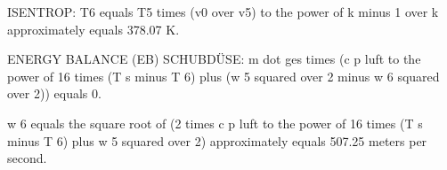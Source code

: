 ISENTROP: T6 equals T5 times (v0 over v5) to the power of k minus 1 over k approximately equals 378.07 K.

ENERGY BALANCE (EB) SCHUBDÜSE:
m dot ges times (c p luft to the power of 16 times (T s minus T 6) plus (w 5 squared over 2 minus w 6 squared over 2)) equals 0.

w 6 equals the square root of (2 times c p luft to the power of 16 times (T s minus T 6) plus w 5 squared over 2) approximately equals 507.25 meters per second.
